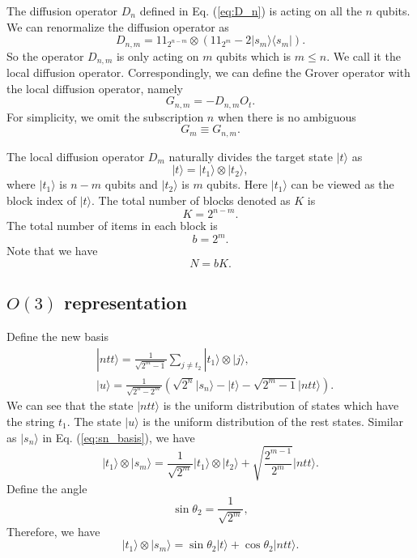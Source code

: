 \documentclass[a4paper,10pt]{article}
\numberwithin{equation}{section}
\begin{document}
The diffusion operator $D_n$ defined in Eq. (\ref{eq:D_n}) is acting on all the $n$ qubits. We can renormalize the diffusion operator as 
\begin{equation}
    D_{n,m} = 1\!\!1_{2^{n-m}}\otimes (1\!\!1_{2^{m}} - 2|s_m\rangle\langle s_m|).
\end{equation}
So the operator $D_{n,m}$ is only acting on $m$ qubits which is $m\leq n$. We call it the local diffusion operator. Correspondingly, we can define the Grover operator with the local diffusion operator, namely
\begin{equation}
\label{eq:G_m}
    G_{n,m} = -D_{n,m}O_t.
\end{equation}
For simplicity, we omit the subscription $n$ when there is no ambiguous
\begin{equation}
    G_m \equiv G_{n,m}.
\end{equation}


The local diffusion operator $D_m$ naturally divides the target state $|t\rangle$ as 
\begin{equation}
    |t\rangle = |t_1\rangle\otimes |t_2\rangle,
\end{equation}
where $|t_1\rangle$ is $n-m$ qubits and $|t_2\rangle$ is $m$ qubits. Here $|t_1\rangle$ can be viewed as the block index of $|t\rangle$. The total number of blocks denoted as $K$ is
\begin{equation}
    K = 2^{n-m}.
\end{equation}
The total number of items in each block is
\begin{equation}
    b = 2^m.
\end{equation}
Note that we have 
\begin{equation}
    N = bK.
\end{equation}


\subsection{\texorpdfstring{$O(3)$}{Lg} representation}

Define the new basis
\begin{align}
    & |ntt\rangle = \frac{1}{\sqrt{2^m-1}}\sum_{j\neq t_2}|t_1\rangle\otimes |j\rangle, \\
    & |u\rangle = \frac{1}{\sqrt{2^n-2^m}}\left(\sqrt{2^n}|s_n\rangle - |t\rangle - \sqrt{2^m-1}|ntt\rangle\right).
\end{align}
We can see that the state $|ntt\rangle$ is the uniform distribution of states which have the string $t_1$. The state $|u\rangle$ is the uniform distribution of the rest states. Similar as $|s_n\rangle$ in Eq. (\ref{eq:sn_basis}), we have
\begin{equation}
    |t_1\rangle\otimes |s_m\rangle = \frac{1}{\sqrt{2^m}}|t_1\rangle \otimes |t_2\rangle + \sqrt{\frac{2^{m-1}}{2^m}} |ntt\rangle.
\end{equation}
Define the angle
\begin{equation}
    \sin\theta_2 = \frac{1}{\sqrt{2^m}},
\end{equation}
Therefore, we have
\begin{equation}
    |t_1\rangle\otimes |s_m\rangle = \sin\theta_2|t\rangle + \cos\theta_2 |ntt\rangle.
\end{equation}
\end{document}
